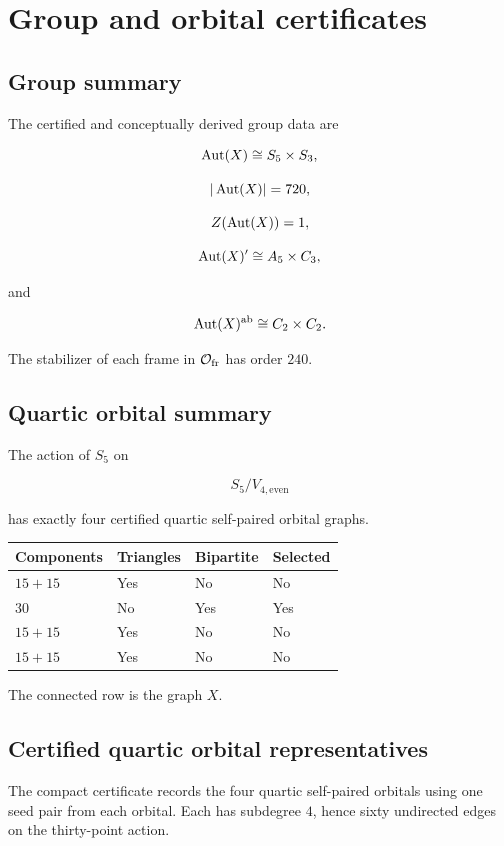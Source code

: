 \section{Group and orbital certificates}

\subsection{Group summary}

The certified and conceptually derived group data are

\[
\operatorname{Aut}(X)\cong S_5\times S_3,
\]

\[
|\operatorname{Aut}(X)|=720,
\]

\[
Z(\operatorname{Aut}(X))=1,
\]

\[
\operatorname{Aut}(X)'
\cong
A_5\times C_3,
\]

and

\[
\operatorname{Aut}(X)^{\mathrm{ab}}
\cong
C_2\times C_2.
\]

The stabilizer of each frame in \(\mathcal O_{\mathrm{fr}}\) has order \(240\).

\subsection{Quartic orbital summary}

The action of \(S_5\) on

\[
S_5/V_{4,\mathrm{even}}
\]

has exactly four certified quartic self-paired orbital graphs.

\begin{center}
\begin{tabular}{llll}
\toprule
Components & Triangles & Bipartite & Selected\\
\midrule
\(15+15\) & Yes & No & No\\
\(30\) & No & Yes & Yes\\
\(15+15\) & Yes & No & No\\
\(15+15\) & Yes & No & No\\
\bottomrule
\end{tabular}
\end{center}

The connected row is the graph \(X\).

\subsection{Certified quartic orbital representatives}

The compact certificate records the four quartic self-paired orbitals
using one seed pair from each orbital. Each has subdegree \(4\), hence
sixty undirected edges on the thirty-point action.

